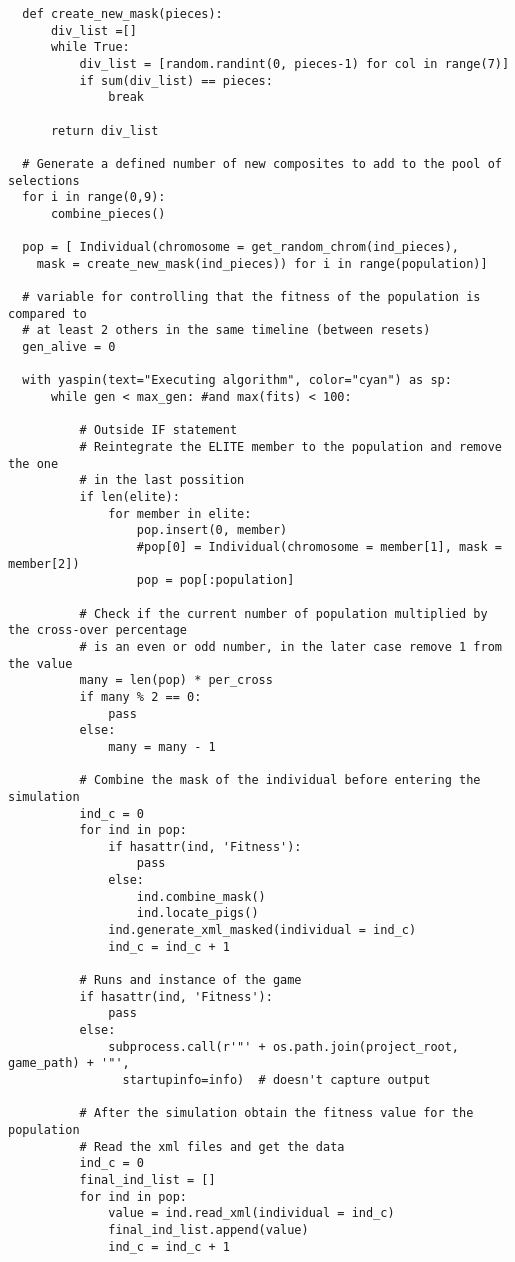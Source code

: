 \begin{verbatim}
  def create_new_mask(pieces):
      div_list =[]
      while True:
          div_list = [random.randint(0, pieces-1) for col in range(7)]
          if sum(div_list) == pieces:
              break
      
      return div_list

  # Generate a defined number of new composites to add to the pool of selections
  for i in range(0,9):
      combine_pieces()

  pop = [ Individual(chromosome = get_random_chrom(ind_pieces), 
    mask = create_new_mask(ind_pieces)) for i in range(population)]
  
  # variable for controlling that the fitness of the population is compared to 
  # at least 2 others in the same timeline (between resets)
  gen_alive = 0  

  with yaspin(text="Executing algorithm", color="cyan") as sp: 
      while gen < max_gen: #and max(fits) < 100:
                  
          # Outside IF statement
          # Reintegrate the ELITE member to the population and remove the one 
          # in the last possition
          if len(elite):
              for member in elite:
                  pop.insert(0, member)
                  #pop[0] = Individual(chromosome = member[1], mask = member[2])
                  pop = pop[:population]

          # Check if the current number of population multiplied by the cross-over percentage
          # is an even or odd number, in the later case remove 1 from the value
          many = len(pop) * per_cross
          if many % 2 == 0:
              pass
          else:
              many = many - 1

          # Combine the mask of the individual before entering the simulation
          ind_c = 0
          for ind in pop:
              if hasattr(ind, 'Fitness'):
                  pass
              else:
                  ind.combine_mask()
                  ind.locate_pigs()
              ind.generate_xml_masked(individual = ind_c)
              ind_c = ind_c + 1
          
          # Runs and instance of the game
          if hasattr(ind, 'Fitness'):
              pass
          else:
              subprocess.call(r'"' + os.path.join(project_root, game_path) + '"', 
                startupinfo=info)  # doesn't capture output

          # After the simulation obtain the fitness value for the population
          # Read the xml files and get the data
          ind_c = 0
          final_ind_list = []
          for ind in pop:
              value = ind.read_xml(individual = ind_c)
              final_ind_list.append(value)
              ind_c = ind_c + 1


\end{verbatim}
